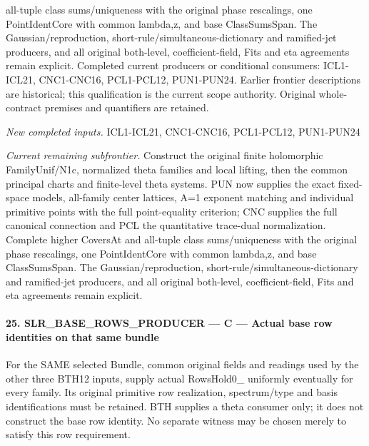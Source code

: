 all-tuple class sums/uniqueness with the original phase rescalings, one PointIdentCore with common lambda,z, and base ClassSumsSpan. The Gaussian/reproduction, short-rule/simultaneous-dictionary and ramified-jet producers, and all original both-level, coefficient-field, Fits and eta agreements remain explicit. Completed current producers or conditional consumers: ICL1-ICL21, CNC1-CNC16, PCL1-PCL12, PUN1-PUN24. Earlier frontier descriptions are historical; this qualification is the current scope authority. Original whole-contract premises and quantifiers are retained.

\emph{New completed inputs.} ICL1-ICL21, CNC1-CNC16, PCL1-PCL12, PUN1-PUN24

\emph{Current remaining subfrontier.} Construct the original finite holomorphic FamilyUnif/N1c, normalized theta families and local lifting, then the common principal charts and finite-level theta systems. PUN now supplies the exact fixed-space models, all-family center lattices, A=1 exponent matching and individual primitive points with the full point-equality criterion; CNC supplies the full canonical connection and PCL the quantitative trace-dual normalization. Complete higher CoversAt and all-tuple class sums/uniqueness with the original phase rescalings, one PointIdentCore with common lambda,z, and base ClassSumsSpan. The Gaussian/reproduction, short-rule/simultaneous-dictionary and ramified-jet producers, and all original both-level, coefficient-field, Fits and eta agreements remain explicit.



\paragraph{25. SLR\_\allowbreak BASE\_\allowbreak ROWS\_\allowbreak PRODUCER — C — Actual base row identities on that same bundle}

For the SAME selected Bundle, common original fields and readings used by the other three BTH12 inputs, supply actual RowsHold0\_ uniformly eventually for every family. Its original primitive row realization, spectrum/type and basis identifications must be retained. BTH supplies a theta consumer only; it does not construct the base row identity. No separate witness may be chosen merely to satisfy this row requirement.


